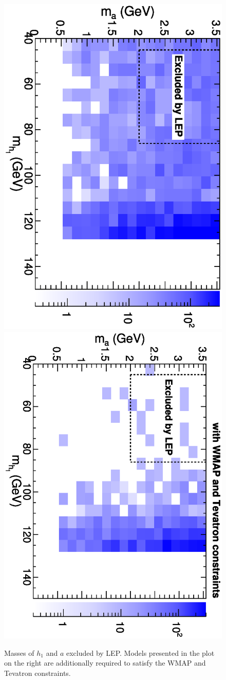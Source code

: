 \documentclass[aps,12pt,superscriptaddress,nofootinbib,floatfix,showpacs]{revtex4}
\begin{document}
\begin{figure}
\includegraphics[height=0.48\linewidth, angle=90]{plots/newbranching/exclusionplot_lep2_noDMTev.eps}
\includegraphics[height=0.48\linewidth, angle=90]{plots/newbranching/exclusionplot_lep2.eps}

\caption{Masses of $h_1$ and $a$ excluded by LEP.  Models presented in
  the plot on the right are additionally required to satisfy the WMAP and Tevatron
  constraints. \label{fig:exclusion2}}
\end{figure}


\end{document}
